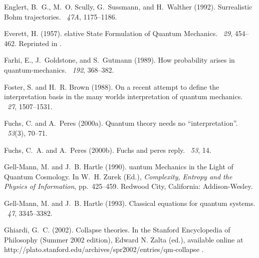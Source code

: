 \documentclass[12pt]{article}
\begin{document}
\begin{thebibliography}{}
Englert, B.~G., M.~O. Scully, G.~Sussmann, and H.~Walther (1992).
\newblock Surrealistic {B}ohm trajectories.
~{\em 47A}, 1175--1186.

Everett, H. (1957).
elative {S}tate {F}ormulation of {Q}uantum {M}echanics.
~{\em 29}, 454--462.
\newblock Reprinted in .

Farhi, E., J.~Goldstone, and S.~Gutmann (1989).
\newblock How probability arises in quantum-mechanics.
~{\em 192}, 368--382.

Foster, S. and H.~R. Brown (1988).
\newblock On a recent attempt to define the interpretation basis in the many
  worlds interpretation of quantum mechanics.
~{\em 27},
  1507--1531.

Fuchs, C. and A.~Peres (2000a).
\newblock Quantum theory needs no ``interpretation''.
~{\em 53\/}(3), 70--71.

Fuchs, C.~A. and A.~Peres (2000b).
\newblock Fuchs and peres reply.
~{\em 53}, 14.

Gell-Mann, M. and J.~B. Hartle (1990).
uantum {M}echanics in the {L}ight of {Q}uantum {C}osmology.
\newblock In W.~H. Zurek (Ed.), {\em Complexity, Entropy and the Physics of
  Information}, pp.\  425--459. Redwood City, California: Addison-Wesley.

Gell-Mann, M. and J.~B. Hartle (1993).
\newblock Classical equations for quantum systems.
~{\em 47}, 3345--3382.

Ghiardi, G.~C. (2002).
\newblock Collapse theories.
\newblock In the Stanford Encyclopedia of Philosophy (Summer 2002 edition),
  Edward N. Zalta (ed.), available online at
  http://plato.stanford.edu/archives/spr2002/entries/qm-collapse .


\end{thebibliography}
\end{document}
